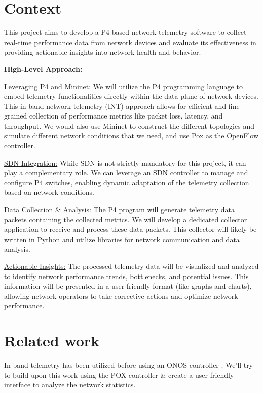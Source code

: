 \documentclass{hotnets23}
\begin{document}
\section*{Context}
This project aims to develop a P4-based network telemetry software to collect real-time performance data from network devices and evaluate its effectiveness in providing actionable insights into network health and behavior.

\textbf{High-Level Approach:} 

\underline{Leveraging P4 and Mininet}: We will utilize the P4 programming language to embed telemetry functionalities directly within the data plane of network devices. This in-band network telemetry (INT) approach allows for efficient and fine-grained collection of performance metrics like packet loss, latency, and throughput.\cite{InBand} We would also use Mininet to construct the different topologies and simulate different network conditions that we need, and use Pox as the OpenFlow controller.

\underline{SDN Integration:} While SDN is not strictly mandatory for this project, it can play a complementary role.  We can leverage an SDN controller to manage and configure P4 switches, enabling dynamic adaptation of the telemetry collection based on network conditions.

\underline{Data Collection \& Analysis:} The P4 program will generate telemetry data packets containing the collected metrics. We will develop a dedicated collector application to receive and process these data packets. This collector will likely be written in Python and utilize libraries for network communication and data analysis.

\underline{Actionable Insights:} The processed telemetry data will be visualized and analyzed to identify network performance trends, bottlenecks, and potential issues. This information will be presented in a user-friendly format (like graphs and charts), allowing network operators to take corrective actions and optimize network performance.


\section*{Related work}

In-band telemetry has been utilized before using an ONOS controller \cite{ONOS}. We'll try to build upon this work using the POX controller \& create a user-friendly interface to analyze the network statistics.

 
\begin{small}

\end{small}

\end{document}
